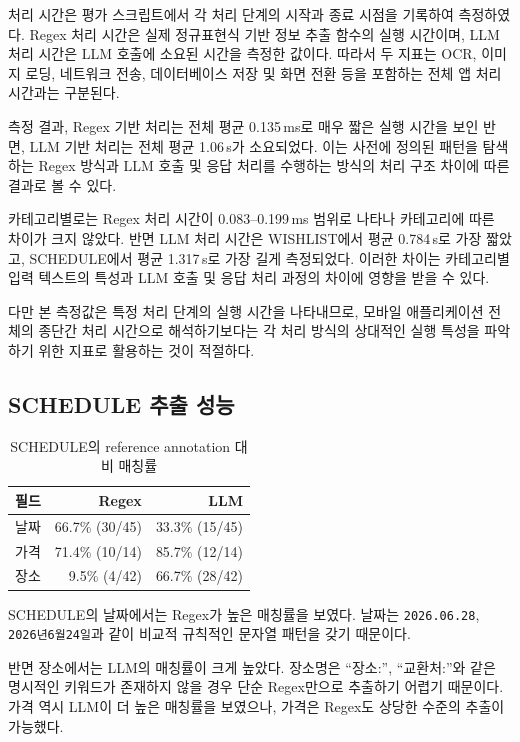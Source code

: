 \documentclass[11pt,a4paper]{article}
\begin{document}
처리 시간은 평가 스크립트에서 각 처리 단계의 시작과 종료 시점을 기록하여 측정하였다. Regex 처리 시간은 실제 정규표현식 기반 정보 추출 함수의 실행 시간이며, LLM 처리 시간은 LLM 호출에 소요된 시간을 측정한 값이다. 따라서 두 지표는 OCR, 이미지 로딩, 네트워크 전송, 데이터베이스 저장 및 화면 전환 등을 포함하는 전체 앱 처리 시간과는 구분된다.

측정 결과, Regex 기반 처리는 전체 평균 0.135\,ms로 매우 짧은 실행 시간을 보인 반면, LLM 기반 처리는 전체 평균 1.06\,s가 소요되었다. 이는 사전에 정의된 패턴을 탐색하는 Regex 방식과 LLM 호출 및 응답 처리를 수행하는 방식의 처리 구조 차이에 따른 결과로 볼 수 있다.

카테고리별로는 Regex 처리 시간이 0.083--0.199\,ms 범위로 나타나 카테고리에 따른 차이가 크지 않았다. 반면 LLM 처리 시간은 WISHLIST에서 평균 0.784\,s로 가장 짧았고, SCHEDULE에서 평균 1.317\,s로 가장 길게 측정되었다. 이러한 차이는 카테고리별 입력 텍스트의 특성과 LLM 호출 및 응답 처리 과정의 차이에 영향을 받을 수 있다.

다만 본 측정값은 특정 처리 단계의 실행 시간을 나타내므로, 모바일 애플리케이션 전체의 종단간 처리 시간으로 해석하기보다는 각 처리 방식의 상대적인 실행 특성을 파악하기 위한 지표로 활용하는 것이 적절하다.

\subsection{SCHEDULE 추출 성능}

\begin{table}[H]
\centering
\small
\begin{tabularx}{0.92\linewidth}{l r r}
\toprule
\textbf{필드} & \textbf{Regex} & \textbf{LLM}\\
\midrule
날짜 & 66.7\% (30/45) & 33.3\% (15/45)\\
가격 & 71.4\% (10/14) & 85.7\% (12/14)\\
장소 & 9.5\% (4/42) & 66.7\% (28/42)\\
\bottomrule
\end{tabularx}
\caption{SCHEDULE의 reference annotation 대비 매칭률}
\end{table}

SCHEDULE의 날짜에서는 Regex가 높은 매칭률을 보였다. 날짜는 \texttt{2026.06.28}, \texttt{2026년6월24일}과 같이 비교적 규칙적인 문자열 패턴을 갖기 때문이다.

반면 장소에서는 LLM의 매칭률이 크게 높았다. 장소명은 ``장소:'', ``교환처:''와 같은 명시적인 키워드가 존재하지 않을 경우 단순 Regex만으로 추출하기 어렵기 때문이다. 가격 역시 LLM이 더 높은 매칭률을 보였으나, 가격은 Regex도 상당한 수준의 추출이 가능했다.
\end{document}

